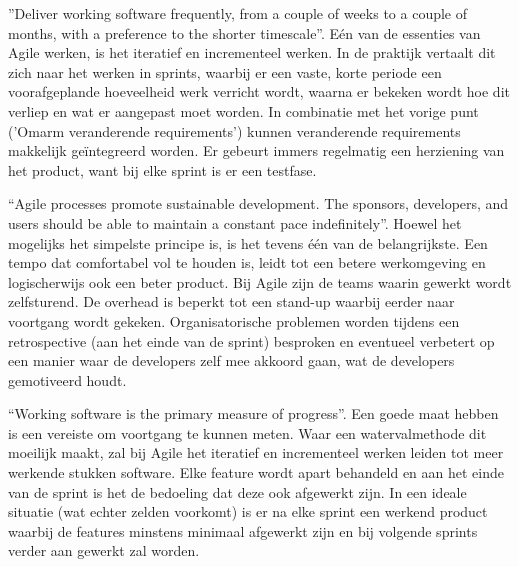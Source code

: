 ''Deliver working software frequently, from a
couple of weeks to a couple of months, with a
preference to the shorter timescale''\autocite{Beck2001}. Eén van de essenties van Agile werken, is het iteratief en incrementeel werken. In de praktijk vertaalt dit zich naar het werken in sprints, waarbij er een vaste, korte periode een voorafgeplande hoeveelheid werk verricht wordt, waarna er bekeken wordt hoe dit verliep en wat er aangepast moet worden. In combinatie met het vorige punt ('Omarm veranderende requirements') kunnen veranderende requirements makkelijk geïntegreerd worden. Er gebeurt immers regelmatig een herziening van het product, want bij elke sprint is er een testfase.


``Agile processes promote sustainable development.
The sponsors, developers, and users should be able
to maintain a constant pace indefinitely''\autocite{Beck2001}. Hoewel het mogelijks het simpelste principe is, is het tevens één van de belangrijkste. Een tempo dat comfortabel vol te houden is, leidt tot een betere werkomgeving en logischerwijs ook een beter product. Bij Agile zijn de teams waarin gewerkt wordt zelfsturend. De overhead is beperkt tot een stand-up waarbij eerder naar voortgang wordt gekeken. Organisatorische problemen worden tijdens een retrospective (aan het einde van de sprint) besproken en eventueel verbetert op een manier waar de developers zelf mee akkoord gaan, wat de developers gemotiveerd houdt.

``Working software is the primary measure of progress''\autocite{Beck2001}. Een goede maat hebben is een vereiste om voortgang te kunnen meten. Waar een watervalmethode dit moeilijk maakt, zal bij Agile het iteratief en incrementeel werken leiden tot meer werkende stukken software. Elke feature wordt apart behandeld en aan het einde van de sprint is het de bedoeling dat deze ook afgewerkt zijn. In een ideale situatie (wat echter zelden voorkomt) is er na elke sprint een werkend product waarbij de features minstens minimaal afgewerkt zijn en bij volgende sprints verder aan gewerkt zal worden.

